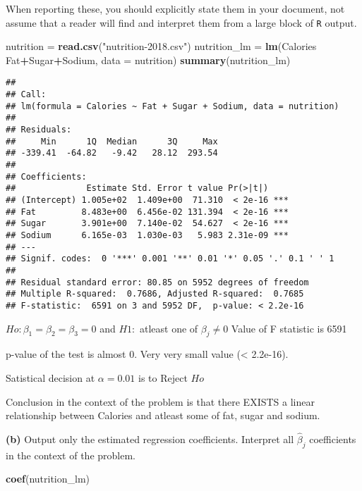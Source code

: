 \documentclass[
]{article}
\newenvironment{Shaded}{\begin{snugshade}}{\end{snugshade}}
\newcommand{\DataTypeTok}[1]{\textcolor[rgb]{0.13,0.29,0.53}{#1}}
\newcommand{\KeywordTok}[1]{\textcolor[rgb]{0.13,0.29,0.53}{\textbf{#1}}}
\newcommand{\NormalTok}[1]{#1}
\newcommand{\OperatorTok}[1]{\textcolor[rgb]{0.81,0.36,0.00}{\textbf{#1}}}
\newcommand{\StringTok}[1]{\textcolor[rgb]{0.31,0.60,0.02}{#1}}
\begin{document}
When reporting these, you should explicitly state them in your document,
not assume that a reader will find and interpret them from a large block
of \texttt{R} output.

\begin{Shaded}
\begin{Highlighting}[]
\NormalTok{nutrition =}\StringTok{ }\KeywordTok{read.csv}\NormalTok{(}\StringTok{"nutrition-2018.csv"}\NormalTok{)}
\NormalTok{nutrition_lm =}\StringTok{ }\KeywordTok{lm}\NormalTok{(Calories }\OperatorTok{~}\StringTok{ }\NormalTok{Fat}\OperatorTok{+}\NormalTok{Sugar}\OperatorTok{+}\NormalTok{Sodium, }\DataTypeTok{data =}\NormalTok{ nutrition)}
\KeywordTok{summary}\NormalTok{(nutrition_lm)}
\end{Highlighting}
\end{Shaded}

\begin{verbatim}
## 
## Call:
## lm(formula = Calories ~ Fat + Sugar + Sodium, data = nutrition)
## 
## Residuals:
##     Min      1Q  Median      3Q     Max 
## -339.41  -64.82   -9.42   28.12  293.54 
## 
## Coefficients:
##              Estimate Std. Error t value Pr(>|t|)    
## (Intercept) 1.005e+02  1.409e+00  71.310  < 2e-16 ***
## Fat         8.483e+00  6.456e-02 131.394  < 2e-16 ***
## Sugar       3.901e+00  7.140e-02  54.627  < 2e-16 ***
## Sodium      6.165e-03  1.030e-03   5.983 2.31e-09 ***
## ---
## Signif. codes:  0 '***' 0.001 '**' 0.01 '*' 0.05 '.' 0.1 ' ' 1
## 
## Residual standard error: 80.85 on 5952 degrees of freedom
## Multiple R-squared:  0.7686, Adjusted R-squared:  0.7685 
## F-statistic:  6591 on 3 and 5952 DF,  p-value: < 2.2e-16
\end{verbatim}

\(Ho: \beta_1 = \beta_2 = \beta_3 = 0\) and \(H1:\) atleast one of
\(\beta_j \neq 0\) Value of F statistic is 6591

p-value of the test is almost 0. Very very small value (\textless{}
2.2e-16).

Satistical decision at \(\alpha = 0.01\) is to Reject \(Ho\)

Conclusion in the context of the problem is that there EXISTS a linear
relationship between Calories and atleast some of fat, sugar and sodium.

\textbf{(b)} Output only the estimated regression coefficients.
Interpret all \(\hat{\beta}_j\) coefficients in the context of the
problem.

\begin{Shaded}
\begin{Highlighting}[]
\KeywordTok{coef}\NormalTok{(nutrition_lm)}
\end{Highlighting}
\end{Shaded}
\end{document}
